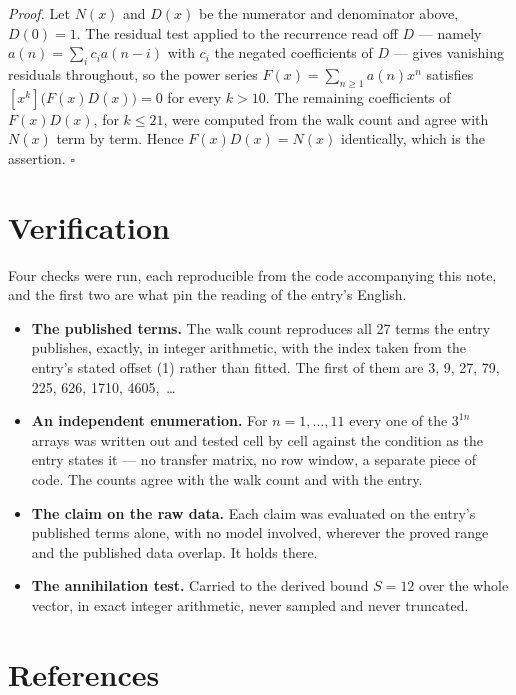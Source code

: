 \documentclass[11pt]{article}
\theoremstyle{definition}
\begin{document}
{\itshape Proof.} Let $N(x)$ and $D(x)$ be the numerator and denominator above, $D(0)=1$. The residual test applied to the recurrence read off $D$ --- namely $a(n) = \sum_i c_i a(n-i)$ with $c_i$ the negated coefficients of $D$ --- gives vanishing residuals throughout, so the power series $F(x)=\sum_{n\ge 1}a(n)x^n$ satisfies $[x^k]\bigl(F(x)D(x)\bigr) = 0$ for every $k > 10$. The remaining coefficients of $F(x)D(x)$, for $k \le 21$, were computed from the walk count and agree with $N(x)$ term by term. Hence $F(x)D(x) = N(x)$ identically, which is the assertion. $\square$

\section{Verification}

Four checks were run, each reproducible from the code accompanying this note, and the first two are what pin the reading of the entry's English.

\begin{itemize}

\item {\bfseries The published terms.} The walk count reproduces all 27 terms the entry publishes, exactly, in integer arithmetic, with the index taken from the entry's stated offset (1) rather than fitted. The first of them are 3, 9, 27, 79, 225, 626, 1710, 4605,~\dots

\item {\bfseries An independent enumeration.} For $n = 1,\dots,11$ every one of the $3^{1n}$ arrays was written out and tested cell by cell against the condition as the entry states it --- no transfer matrix, no row window, a separate piece of code. The counts agree with the walk count and with the entry.

\item {\bfseries The claim on the raw data.} Each claim was evaluated on the entry's published terms alone, with no model involved, wherever the proved range and the published data overlap. It holds there.

\item {\bfseries The annihilation test.} Carried to the derived bound $S = 12$ over the whole vector, in exact integer arithmetic, never sampled and never truncated.

\end{itemize}

\section{References}
\end{document}
